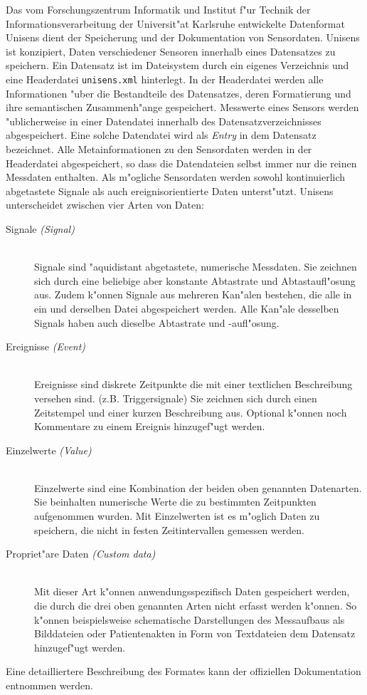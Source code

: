 Das vom Forschungszentrum Informatik und Institut f"ur Technik der Informationsverarbeitung der Universit"at Karlsruhe entwickelte Datenformat Unisens dient der Speicherung und der Dokumentation von Sensordaten.
Unisens ist konzipiert, Daten verschiedener Sensoren innerhalb eines Datensatzes zu speichern.
Ein Datensatz ist im Dateisystem durch ein eigenes Verzeichnis und eine Headerdatei \verb|unisens.xml| hinterlegt.
In der Headerdatei werden alle Informationen "uber die Bestandteile des Datensatzes, deren Formatierung und ihre semantischen Zusammenh"ange gespeichert.
Messwerte eines Sensors werden "ublicherweise in einer Datendatei innerhalb des Datensatzverzeichnisses abgespeichert.
Eine solche Datendatei wird als \emph{Entry} in dem Datensatz bezeichnet.
Alle Metainformationen zu den Sensordaten werden in der Headerdatei abgespeichert, so dass die Datendateien selbst immer nur die reinen Messdaten enthalten.
Als m"ogliche Sensordaten werden sowohl kontinuierlich abgetastete Signale als auch ereignisorientierte Daten unterst"utzt.
Unisens unterscheidet zwischen vier Arten von Daten:
\begin{description}
	\item[Signale \emph{(Signal)}] \hfill \\
		Signale sind "aquidistant abgetastete, numerische Messdaten.
		Sie zeichnen sich durch eine beliebige aber konstante Abtastrate und Abtastaufl"osung aus.
		Zudem k"onnen Signale aus mehreren Kan"alen bestehen, die alle in ein und derselben Datei abgespeichert werden.
		Alle Kan"ale desselben Signals haben auch dieselbe Abtastrate und -aufl"osung.
	\item[Ereignisse \emph{(Event)}] \hfill \\
		Ereignisse sind diskrete Zeitpunkte die mit einer textlichen Beschreibung versehen sind. (z.B. Triggersignale)
		Sie zeichnen sich durch einen Zeitstempel und einer kurzen Beschreibung aus.
		Optional k"onnen noch Kommentare zu einem Ereignis hinzugef"ugt werden.
	\item[Einzelwerte \emph{(Value)}] \hfill \\
		Einzelwerte sind eine Kombination der beiden oben genannten Datenarten.
		Sie beinhalten numerische Werte die zu bestimmten Zeitpunkten aufgenommen wurden.
		Mit Einzelwerten ist es m"oglich Daten zu speichern, die nicht in festen Zeitintervallen gemessen werden.
	\item[Propriet"are Daten \emph{(Custom data)}] \hfill \\
		Mit dieser Art k"onnen anwendungsspezifisch Daten gespeichert werden, die durch die drei oben genannten Arten nicht erfasst werden k"onnen.
		So k"onnen beispielsweise schematische Darstellungen des Messaufbaus als Bilddateien oder Patientenakten in Form von Textdateien dem Datensatz hinzugef"ugt werden.
\end{description}
Eine detailliertere Beschreibung des Formates kann der offiziellen Dokumentation \cite{Ottenbacher2010} entnommen werden.

